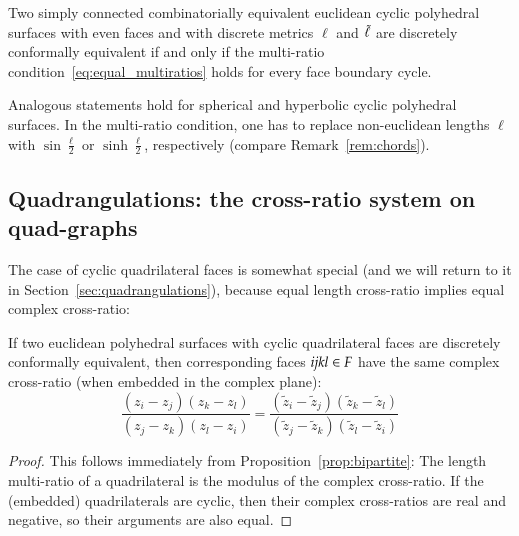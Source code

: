 \documentclass[Thesis]{subfiles}
\begin{document}
\begin{corollary}
  \label{cor:simply_connected_bipartite}
  Two simply connected combinatorially equivalent euclidean cyclic
  polyhedral surfaces with even faces and with discrete metrics $\ell$
  and $\tilde{\ell}$ are discretely conformally equivalent if and only
  if the multi-ratio condition~\eqref{eq:equal_multiratios} holds for
  every face boundary cycle.
\end{corollary}

\begin{remark}
  Analogous statements hold for spherical and hyperbolic cyclic
  polyhedral surfaces. In the multi-ratio condition, one has to replace
  non-euclidean lengths $\ell$ with $\sin\frac{\ell}{2}$ or
  $\sinh\frac{\ell}{2}$, respectively (compare
  Remark~\ref{rem:chords}).
\end{remark}

\subsection{Quadrangulations: the cross-ratio system on quad-graphs}
\label{sec:quads}

The case of cyclic quadrilateral faces is somewhat special (and we
will return to it in Section~\ref{sec:quadrangulations}), because
equal length cross-ratio implies equal complex cross-ratio:

\begin{proposition}
  \label{prop:quad}
  If two euclidean polyhedral surfaces with cyclic quadrilateral faces
  are discretely conformally equivalent, then corresponding faces ${\it
  ijkl}\in F$ have the same complex cross-ratio (when embedded in the
  complex plane):
  \begin{equation*}
    \frac{(z_{i}-z_{j})(z_{k}-z_{l})}{(z_{j}-z_{k})(z_{l}-z_{i})}=
    \frac{(\tilde z_{i}-\tilde z_{j})(\tilde z_{k}-\tilde z_{l})}{(\tilde z_{j}-\tilde z_{k})(\tilde z_{l}- \tilde z_{i})}
  \end{equation*}
\end{proposition}

\begin{proof}
  This follows immediately from Proposition~\ref{prop:bipartite}: The
  length multi-ratio of a quadrilateral is the modulus of the complex
  cross-ratio. If the (embedded) quadrilaterals are cyclic, then their
  complex cross-ratios are real and negative, so their arguments are
  also equal.
\end{proof}
\end{document}
